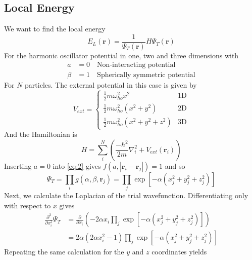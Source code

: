 \documentclass[
    a4paper, aps, twocolumn, floatfix, superscriptaddress,
    nofootinbib]{revtex4-1}
\begin{document}
\begin{appendices}
\section{Local Energy}\label{appendix:local_energy}
We want to find the local energy  
\begin{equation}\label{local_energy}
   E_L(\boldsymbol{r}) =  \frac{1}{\Psi_T(\boldsymbol{r})} H \Psi_T(\boldsymbol{r})
\end{equation}
For the harmonic oscillator potential in one, two and three dimensions with
\begin{align*}
    a&=0 \quad \text{Non-interacting potential} \\
    \beta& = 1 \quad \text{Spherically symmetric potential}
\end{align*}
For $N$ particles. The external potential in this case is given by 
\begin{equation}
    V_{ext} =
    \begin{cases}
      \frac{1}{2}m \omega_{ho}^2 x^2 &  1\text{D}\\
     \frac{1}{2}m \omega_{ho}^2\left( x^2 +  y^2 \right) & 2\text{D}\\
     \frac{1}{2}m \omega_{ho}^2\left(x^2 +  y^2 +z^2 \right) & 3\text{D}
    \end{cases} 
\end{equation}
And the Hamiltonian is 
\begin{equation}
    H = \sum_i^N \left(\frac{-\hbar^2}{2m} \nabla_i^2 + V_{ext}(\boldsymbol{r}_i)\right)
\end{equation}
Inserting $a=0$ into \eqref{eq:2} gives $f(a,|\boldsymbol{r}_i - \boldsymbol{r}_j|) =1$ and so
\begin{equation}
    \Psi_T = \prod_i g(\alpha,\beta,\boldsymbol{r}_j) = \prod_j \exp\left[ -\alpha \left(x_j^2 + y_j^2 + z_j^2\right)\right]
\end{equation}
Next, we calculate the Laplacian of the trial wavefunction. Differentiating only with respect to $x$ gives
\begin{align*}
    \frac{\partial^2}{\partial x_i^2} \Psi_T &= \frac{\partial}{\partial x_i} \left(-2\alpha x_i \prod_j \exp\left[ -\alpha \left(x_j^2 + y_j^2 + z_j^2\right)\right] \right)\\
    &= 2\alpha \left(2\alpha x_i^2 -1\right) \prod_j \exp\left[ -\alpha \left(x_j^2 + y_j^2 + z_j^2\right)\right]
\end{align*}
Repeating the same calculation for the $y$ and $z$ coordinates yields
\begin{equation}

\end{equation}
\end{appendices}
\end{document}
